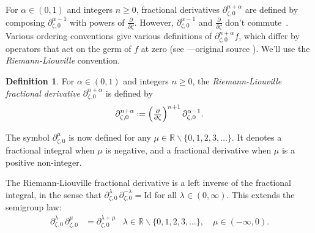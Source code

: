 \documentclass{article}
\theoremstyle{definition}
\newcommand{\R}{\mathbb{R}}
\newcommand{\fracderiv}[3]{\partial^{#1}_{#2, #3}}
\newcommand*{\defeq}{\mathrel{\vcenter{\baselineskip0.5ex \lineskiplimit0pt
                     \hbox{\scriptsize.}\hbox{\scriptsize.}}}%
                     =}
\newcommand{\laplace}{\mathcal{L}}
\newtheorem{definition}{Definition}[section]
\theoremstyle{plain}
\begin{document}
For $\alpha \in (0, 1)$ and integers $n \ge 0$, fractional derivatives $\fracderiv{n+\alpha}{\zeta}{0}$ are defined by composing $\fracderiv{\alpha-1}{\zeta}{0}$ with powers of $\tfrac{\partial}{\partial \zeta}$. However, $\fracderiv{\alpha-1}{\zeta}{0}$ and $\tfrac{\partial}{\partial \zeta}$ don't commute~\cite[equation 54]{mladenov2014advanced}. Various ordering conventions give various definitions of $\fracderiv{n+\alpha}{\zeta}{0} f$, which differ by operators that act on the germ of $f$ at zero (see \cite[Section 1.3]{mladenov2014advanced}---original source \cite{podlubny}). We'll use the {\em Riemann-Liouville} convention.
\begin{definition}
For $\alpha \in (0, 1)$ and integers $n \ge 0$, the {\em Riemann-Liouville fractional derivative} $\fracderiv{n+\alpha}{\zeta}{0}$ is defined by
\[ \fracderiv{n+\alpha}{\zeta}{0} \defeq \left(\tfrac{\partial}{\partial \zeta}\right)^{n+1} \fracderiv{\alpha-1}{\zeta}{0}. \]
\end{definition}
The symbol $\fracderiv{\mu}{\zeta}{0}$ is now defined for any $\mu \in \R \smallsetminus \{0, 1, 2, 3, \ldots\}$. It denotes a fractional integral when $\mu$ is negative, and a fractional derivative when $\mu$ is a positive non-integer.

The Riemann-Liouville fractional derivative is a left inverse of the fractional integral, in the sense that $\fracderiv{\lambda}{\zeta}{ 0}\,\fracderiv{-\lambda}{\zeta}{0}=\text{Id}$ for all $\lambda \in (0, \infty)$. This extends the semigroup law:
\begin{align*}
\fracderiv{\lambda}{\zeta}{0}\,\fracderiv{\mu}{\zeta}{0} & = \fracderiv{\lambda+\mu}{\zeta}{0} & \lambda \in \R \smallsetminus \{0, 1, 2, 3, \ldots\},\quad\mu \in (-\infty, 0).
\end{align*}


\end{document}
